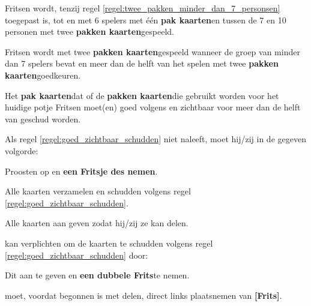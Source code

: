 \vervolgLijst{}
    \item Fritsen wordt, tenzij regel \ref{regel:twee_pakken_minder_dan_7_personsen} toegepast is, tot en met 6 spelers met één \textbf{pak kaarten}\footnotemark[1] en tussen de 7 en 10 personen met twee \textbf{pakken kaarten}\footnotemark[1] gespeeld.
\eindLijst{}

\vervolgLijst{}
    \item Fritsen wordt met twee \textbf{pakken kaarten}\footnotemark[1] gespeeld wanneer de groep van \alleSpelers minder dan 7 spelers bevat en meer dan de helft van \alleSpelers het spelen met twee \textbf{pakken kaarten}\footnotemark[1] goedkeuren. \label{regel:twee_pakken_minder_dan_7_personsen}
\eindLijst{}

\vervolgLijst{}
    \item Het \textbf{pak kaarten}\footnotemark[1] dat of de \textbf{pakken kaarten}\footnotemark[1] die gebruikt worden voor het huidige potje Fritsen moet(en) goed volgens en zichtbaar voor meer dan de helft van \alleSpelers geschud worden.
    \label{regel:goed_zichtbaar_schudden}
\eindLijst{}

\vervolgLijst{}
    \item Als \eenSpeler regel \ref{regel:goed_zichtbaar_schudden} niet naleeft, moet hij/zij in de gegeven volgorde:
    \puntLijst{}
        \item Proosten op  en \textbf{een Fritsje des nemen}\footnotemark[2].
        \item Alle kaarten verzamelen en schudden volgens regel \ref{regel:goed_zichtbaar_schudden}.
        \item Alle kaarten aan \Frits geven zodat hij/zij ze kan delen.
    \eindPuntLijst{}
\eindLijst{}

\vervolgLijst{}
    \item \Frits kan \eenSpeler verplichten om de kaarten te schudden volgens regel \ref{regel:goed_zichtbaar_schudden} door:
    \puntLijst{}
        \item Dit aan te geven en \textbf{een dubbele Frits}\footnotemark[3] te nemen.
    \eindPuntLijst{}
\eindLijst{}


\vervolgLijst{}
    \item \Willem moet, voordat \Frits begonnen is met delen, direct links plaatsnemen van \textbf{[Frits]}.
    \label{regel:Willen_links_van_Frits}
\eindLijst{}

